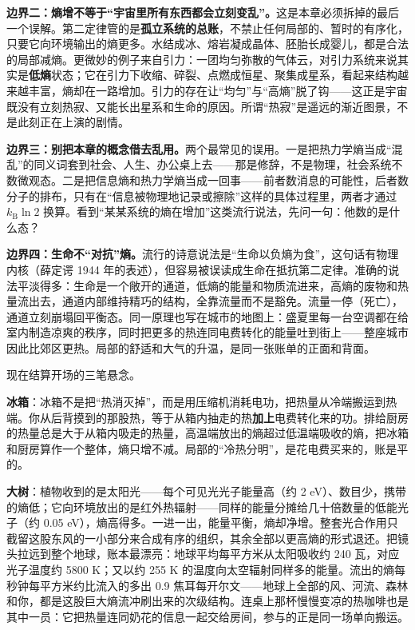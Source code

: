\textbf{边界二：熵增不等于“宇宙里所有东西都会立刻变乱”。}这是本章必须拆掉的最后一个误解。第二定律管的是\textbf{孤立系统的总账}，不禁止任何局部的、暂时的有序化，只要它向环境输出的熵更多。水结成冰、熔岩凝成晶体、胚胎长成婴儿，都是合法的局部减熵。更微妙的例子来自引力：一团均匀弥散的气体云，对引力系统来说其实是\textbf{低熵}状态；它在引力下收缩、碎裂、点燃成恒星、聚集成星系，看起来结构越来越丰富，熵却在一路增加。引力的存在让“均匀”与“高熵”脱了钩——这正是宇宙既没有立刻热寂、又能长出星系和生命的原因。所谓“热寂”是遥远的渐近图景，不是此刻正在上演的剧情。

\textbf{边界三：别把本章的概念借去乱用。}两个最常见的误用。一是把热力学熵当成“混乱”的同义词套到社会、人生、办公桌上去——那是修辞，不是物理，社会系统不数微观态。二是把信息熵和热力学熵当成一回事——前者数消息的可能性，后者数分子的排布，只有在“信息被物理地记录或擦除”这样的具体过程里，两者才通过 $k_{\mathrm{B}}\ln2$ 换算。看到“某某系统的熵在增加”这类流行说法，先问一句：他数的是什么态？

\textbf{边界四：生命不“对抗”熵。}流行的诗意说法是“生命以负熵为食”，这句话有物理内核（薛定谔 1944 年的表述），但容易被误读成生命在抵抗第二定律。准确的说法平淡得多：生命是一个敞开的通道，低熵的能量和物质流进来，高熵的废物和热量流出去，通道内部维持精巧的结构，全靠流量而不是豁免。流量一停（死亡），通道立刻崩塌回平衡态。同一原理也写在城市的地图上：盛夏里每一台空调都在给室内制造凉爽的秩序，同时把更多的热连同电费转化的能量吐到街上——整座城市因此比郊区更热。局部的舒适和大气的升温，是同一张账单的正面和背面。


现在结算开场的三笔悬念。

\textbf{冰箱}：冰箱不是把“热消灭掉”，而是用压缩机消耗电功，把热量从冷端搬运到热端。你从后背摸到的那股热，等于从箱内抽走的热\textbf{加上}电费转化来的功。排给厨房的热量总是大于从箱内吸走的热量，高温端放出的熵超过低温端吸收的熵，把冰箱和厨房算作一个整体，熵只增不减。局部的“冷热分明”，是花电费买来的，账是平的。

\textbf{大树}：植物收到的是太阳光——每个可见光光子能量高（约 2 eV）、数目少，携带的熵低；它向环境放出的是红外热辐射——同样的能量分摊给几十倍数量的低能光子（约 0.05 eV），熵高得多。一进一出，能量平衡，熵却净增。整套光合作用只截留这股东风的一小部分来合成有序的组织，其余全部以更高熵的形式退还。把镜头拉远到整个地球，账本最漂亮：地球平均每平方米从太阳吸收约 240 瓦，对应光子温度约 5800 K；又以约 255 K 的温度向太空辐射同样多的能量。流出的熵每秒钟每平方米约比流入的多出 0.9 焦耳每开尔文——地球上全部的风、河流、森林和你，都是这股巨大熵流冲刷出来的次级结构。连桌上那杯慢慢变凉的热咖啡也是其中一员：它把热量连同奶花的信息一起交给房间，参与的正是同一场单向搬运。


